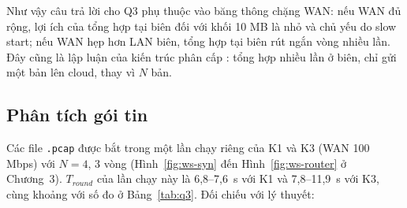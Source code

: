 Như vậy câu trả lời cho Q3 phụ thuộc vào băng thông chặng WAN: nếu WAN đủ rộng, lợi ích của tổng hợp tại biên đối với khối 10 MB là nhỏ và chủ yếu do slow start; nếu WAN hẹp hơn LAN biên, tổng hợp tại biên rút ngắn vòng nhiều lần. Đây cũng là lập luận của kiến trúc phân cấp \cite{liu2020hierfavg}: tổng hợp nhiều lần ở biên, chỉ gửi một bản lên cloud, thay vì $N$ bản.

\subsection{Phân tích gói tin}
Các file \texttt{.pcap} được bắt trong một lần chạy riêng của K1 và K3 (WAN 100 Mbps) với $N = 4$, 3 vòng (Hình~\ref{fig:ws-syn} đến Hình~\ref{fig:ws-router} ở Chương~3). $T_{round}$ của lần chạy này là 6{,}8--7{,}6~s với K1 và 7{,}8--11{,}9~s với K3, cùng khoảng với số đo ở Bảng~\ref{tab:q3}. Đối chiếu với lý thuyết:
